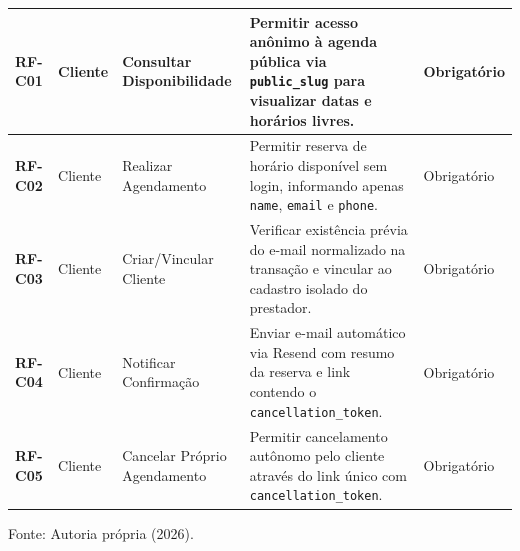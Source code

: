 \documentclass[12pt,a4paper]{article}
\begin{document}
\begin{table}[hbt]
\begin{tabularx}{\textwidth}{|l|l|p{3.4cm}|X|l|}
\textbf{RF-C01} & Cliente & Consultar Disponibilidade & Permitir acesso anônimo à agenda pública via \texttt{public\_slug} para visualizar datas e horários livres. & Obrigatório \\ \hline
\textbf{RF-C02} & Cliente & Realizar Agendamento & Permitir reserva de horário disponível sem login, informando apenas \texttt{name}, \texttt{email} e \texttt{phone}. & Obrigatório \\ \hline
\textbf{RF-C03} & Cliente & Criar/Vincular Cliente & Verificar existência prévia do e-mail normalizado na transação e vincular ao cadastro isolado do prestador. & Obrigatório \\ \hline
\textbf{RF-C04} & Cliente & Notificar Confirmação & Enviar e-mail automático via Resend com resumo da reserva e link contendo o \texttt{cancellation\_token}. & Obrigatório \\ \hline
\textbf{RF-C05} & Cliente & Cancelar Próprio Agendamento & Permitir cancelamento autônomo pelo cliente através do link único com \texttt{cancellation\_token}. & Obrigatório \\ \hline
\end{tabularx}
\vspace{0.1cm}
{\footnotesize Fonte: Autoria própria (2026).}
\end{table}
\end{document}
